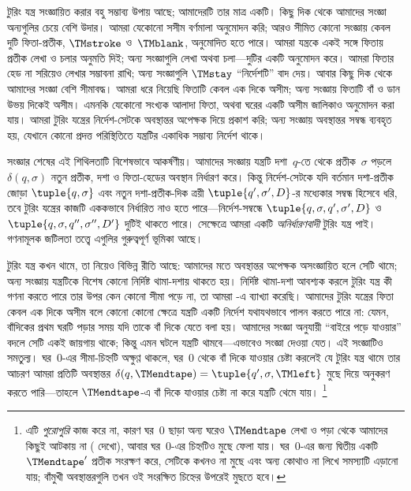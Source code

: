 \documentclass[../../../include/open-logic-section]{subfiles}
\begin{document}

টুরিং যন্ত্র সংজ্ঞায়িত করার বহু সম্ভাব্য উপায় আছে; আমাদেরটি তার মাত্র
একটি। কিছু দিক থেকে আমাদের সংজ্ঞা অন্যগুলির চেয়ে বেশি উদার। আমরা যেকোনো
সসীম বর্ণমালা অনুমোদন করি; আরও সীমিত কোনো সংজ্ঞায় কেবল দুটি ফিতা-প্রতীক,
$\TMstroke$ ও~$\TMblank$, অনুমোদিত হতে পারে। আমরা যন্ত্রকে একই সঙ্গে
ফিতায় প্রতীক লেখা ও চলার অনুমতি দিই; অন্য সংজ্ঞাগুলি লেখা অথবা চলা—দুটির
একটি অনুমোদন করে। আমরা ফিতার হেড না সরিয়েও লেখার সম্ভাবনা রাখি; অন্য
সংজ্ঞাগুলি $\TMstay$ ``নির্দেশটি'' বাদ দেয়। আবার কিছু দিক থেকে আমাদের
সংজ্ঞা বেশি সীমাবদ্ধ। আমরা ধরে নিয়েছি ফিতাটি কেবল এক দিকে অসীম; অন্য
সংজ্ঞায় ফিতাটি বাঁ ও ডান উভয় দিকেই অসীম। এমনকি যেকোনো সংখ্যক আলাদা
ফিতা, অথবা ঘরের একটি অসীম জালিকাও অনুমোদন করা যায়। আমরা টুরিং যন্ত্রের
নির্দেশ-সেটকে অবস্থান্তর অপেক্ষক দিয়ে প্রকাশ করি; অন্য সংজ্ঞায় অবস্থান্তর
সম্বন্ধ ব্যবহৃত হয়, যেখানে কোনো প্রদত্ত পরিস্থিতিতে যন্ত্রটির একাধিক
সম্ভাব্য নির্দেশ থাকে।

সংজ্ঞার শেষের এই শিথিলতাটি বিশেষভাবে আকর্ষণীয়। আমাদের সংজ্ঞায় যন্ত্রটি
দশা~$q$-তে থেকে প্রতীক~$\sigma$ পড়লে $\delta(q, \sigma)$ নতুন প্রতীক,
দশা ও ফিতা-হেডের অবস্থান নির্ধারণ করে। কিন্তু নির্দেশ-সেটকে যদি বর্তমান
দশা-প্রতীক জোড়া $\tuple{q, \sigma}$ এবং নতুন দশা-প্রতীক-দিক ত্রয়ী
$\tuple{q', \sigma', D}$-র মধ্যেকার সম্বন্ধ হিসেবে ধরি, তবে টুরিং
যন্ত্রের কাজটি এককভাবে নির্ধারিত নাও হতে পারে—নির্দেশ-সম্বন্ধে
$\tuple{q, \sigma, q', \sigma', D}$ ও
$\tuple{q, \sigma, q'', \sigma'', D'}$ দুটিই থাকতে পারে। সেক্ষেত্রে
আমরা একটি \emph{অনির্ধারণবাদী} টুরিং যন্ত্র পাই। গণনামূলক জটিলতা তত্ত্বে
এগুলির গুরুত্বপূর্ণ ভূমিকা আছে।

টুরিং যন্ত্র কখন থামে, তা নিয়েও বিভিন্ন রীতি আছে: আমাদের মতে অবস্থান্তর
অপেক্ষক অসংজ্ঞায়িত হলে সেটি থামে; অন্য সংজ্ঞায় যন্ত্রটিকে বিশেষ কোনো
নির্দিষ্ট থামা-দশায় থাকতে হয়। নির্দিষ্ট থামা-দশা আবশ্যক করলে টুরিং
যন্ত্র কী গণনা করতে পারে তার উপর কেন কোনো সীমা পড়ে না, তা আমরা
-এ ব্যাখ্যা করেছি। আমাদের টুরিং যন্ত্রের ফিতা কেবল এক
দিকে অসীম বলে কোনো কোনো ক্ষেত্রে যন্ত্রটি একটি নির্দেশ যথাযথভাবে পালন
করতে পারে না: যেমন, বাঁদিকের প্রথম ঘরটি পড়ার সময় যদি তাকে বাঁ দিকে
যেতে বলা হয়। আমাদের সংজ্ঞা অনুযায়ী ``বাইরে পড়ে যাওয়ার'' বদলে সেটি
একই জায়গায় থাকে; কিন্তু এমন ঘটলে যন্ত্রটি থামবে—এভাবেও সংজ্ঞা দেওয়া
যেত। এই সংজ্ঞাটিও সমতুল্য। ঘর~$0$-এর সীমা-চিহ্নটি অক্ষুণ্ণ থাকলে,
ঘর~$0$ থেকে বাঁ দিকে যাওয়ার চেষ্টা করলেই যে টুরিং যন্ত্র থামে তার আচরণ
আমরা প্রতিটি অবস্থান্তর $\delta(q,\TMendtape) =
\tuple{q',\sigma,\TMleft}$ মুছে দিয়ে অনুকরণ করতে পারি—তাহলে
$\TMendtape$-এ বাঁ দিকে যাওয়ার চেষ্টা না করে যন্ত্রটি থেমে যায়।
\footnote{এটি \emph{পুরোপুরি} কাজ করে না, কারণ ঘর~$0$ ছাড়া অন্য ঘরেও
$\TMendtape$ লেখা ও পড়া থেকে আমাদের কিছুই আটকায় না
( দেখো), আবার ঘর~$0$-এর চিহ্নটিও মুছে ফেলা যায়।
ঘর~$0$-এর জন্য দ্বিতীয় একটি~$\TMendtape'$ প্রতীক সংরক্ষণ করে, সেটিকে
কখনও না মুছে এবং অন্য কোথাও না লিখে সমস্যাটি এড়ানো যায়; বাঁমুখী
অবস্থান্তরগুলি তখন ওই সংরক্ষিত চিহ্নের উপরেই মুছতে হবে।}
\end{document}
